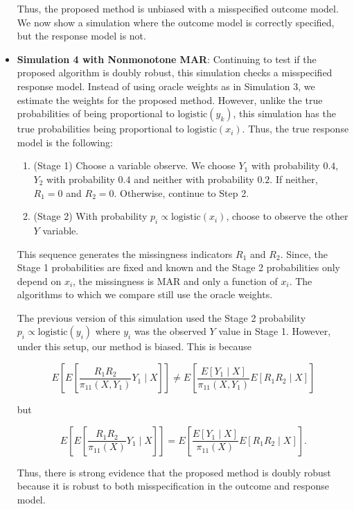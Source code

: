 \documentclass[12pt]{article}
\newcommand{\logistic}{{\text{logistic}}}
\begin{document}
\begin{itemize}
    
    
    

    \newpage

    Thus, the proposed method is unbiased with a misspecified outcome model.
    We now show a simulation where the outcome model is correctly specified, but
    the response model is not.

  \item \textbf{Simulation 4 with Nonmonotone MAR}:
    Continuing to test if the proposed algorithm is doubly robust, this
    simulation checks a misspecified response model. Instead of using oracle
    weights as in Simulation 3, we estimate the weights for the proposed method.
    However, unlike the true probabilities of being proportional to
    $\logistic(y_k)$, this simulation has the true probabilities being
    proportional to $\logistic(x_i)$. Thus, the true response model is the
    following:

    \begin{enumerate}
      \item (Stage 1) Choose a variable observe. We choose $Y_1$ with
        probability $0.4$, $Y_2$ with probability $0.4$ and neither with
        probability $0.2$. If neither, $R_1 = 0$ and $R_2 = 0$. Otherwise,
        continue to Step 2.
      \item (Stage 2) With probability $p_i \propto \logistic(x_i)$, choose to
        observe the other $Y$ variable. 
    \end{enumerate}

    This sequence generates the missingness indicators $R_1$ and $R_2$. Since,
    the Stage 1 probabilities are fixed and known and the Stage 2 probabilities
    only depend on $x_i$, the missingness is MAR and only a function of $x_i$.
    The algorithms to which we compare still use the oracle weights.

    
    
    

    The previous version of this simulation used the Stage 2 probability $p_i
    \propto \logistic(y_i)$ where $y_i$ was the observed $Y$ value in Stage 1.
    However, under this setup, our method is biased. This is because

    \[ E\left[E\left[\frac{R_1 R_2}{\pi_{11}(X, Y_1)} Y_1 \mid X\right]\right] 
    \neq
    E\left[\frac{E[Y_1 \mid X]}{\pi_{11}(X, Y_1)} E[R_1 R_2 \mid X]\right] \]

    but

    \[ E\left[E\left[\frac{R_1 R_2}{\pi_{11}(X)} Y_1 \mid X\right]\right] 
    =
    E\left[\frac{E[Y_1 \mid X]}{\pi_{11}(X)} E[R_1 R_2 \mid X]\right].\]

    Thus, there is strong evidence that the proposed method is 
    doubly robust because it is robust to both misspecification in the outcome
    and response model.
\end{itemize}
\end{document}
